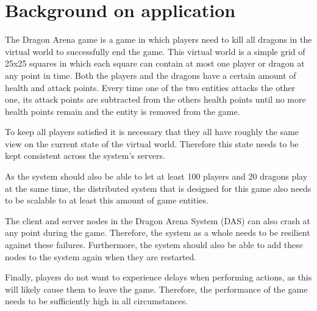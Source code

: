 \section{Background on application}

The Dragon Arena game is a game in which players need to kill all dragons in the virtual world to successfully end the game. 
This virtual world is a simple grid of 25x25 squares in which each square can contain at most one player or dragon at any point in time. 
Both the players and the dragons have a certain amount of health and attack points. 
Every time one of the two entities attacks the other one, its attack points are subtracted from the others health points until no more health points remain and the entity is removed from the game.

To keep all players satisfied it is necessary that they all have roughly the same view on the current state of the virtual world. 
Therefore this state needs to be kept consistent across the system's servers.

As the system should also be able to let at least 100 players and 20 dragons play at the same time, the distributed system that is designed for this game also needs to be scalable to at least this amount of game entities.

The client and server nodes in the Dragon Arena System (DAS) can also crash at any point during the game. 
Therefore, the system as a whole needs to be resilient against these failures. 
Furthermore, the system should also be able to add these nodes to the system again when they are restarted.

Finally, players do not want to experience delays when performing actions, as this will likely cause them to leave the game.
Therefore, the performance of the game needs to be sufficiently high in all circumstances. 